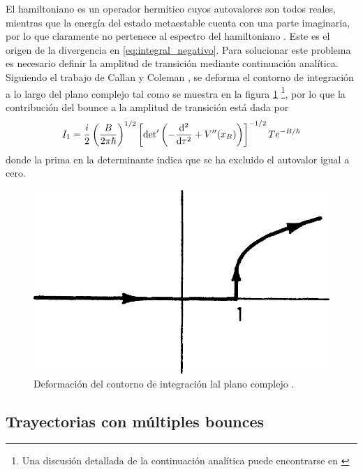 El hamiltoniano es un operador hermítico cuyos autovalores son todos reales, mientras que la energía del estado metaestable cuenta con una parte imaginaria, por lo que claramente no pertenece al espectro del hamiltoniano \cite{paranjape2017theory}. Este es el origen de la divergencia en \eqref{eq:integral_negativo}. Para solucionar este problema es necesario definir la amplitud de transición mediante continuación analítica. Siguiendo el trabajo de Callan y Coleman \cite{callan1977fate}, se deforma el contorno de integración a lo largo del plano complejo tal como se muestra en la figura \ref{fig:contorno} \footnote{Una discusión detallada de la continuación analítica puede encontrarse en \cite{andreassen2017precision, paranjape2017theory}},
por lo que la contribución del bounce a la amplitud de transición está dada por
\begin{equation} \label{eq:I_bounce}
I_1 =  \frac{i}{2}  \left( \frac{B}{2\pi \hbar} \right)^{1/2}  \left[ \textrm{det}' \left(-\dv[2]{}{\tau} + V''\qty(x_B) \right)\right]^{-1/2} T e^{-B/\hbar}
\end{equation}
donde la prima en la determinante indica que se ha excluido el autovalor igual a cero. 
\begin{figure}[h]
	\centering
	\includegraphics[scale=0.2]{FIGURAS/contorno}
	\caption{Deformación del contorno de integración lal plano complejo \cite{callan1977fate}.}
	\label{fig:contorno}
\end{figure}

\subsection{Trayectorias con múltiples bounces}

